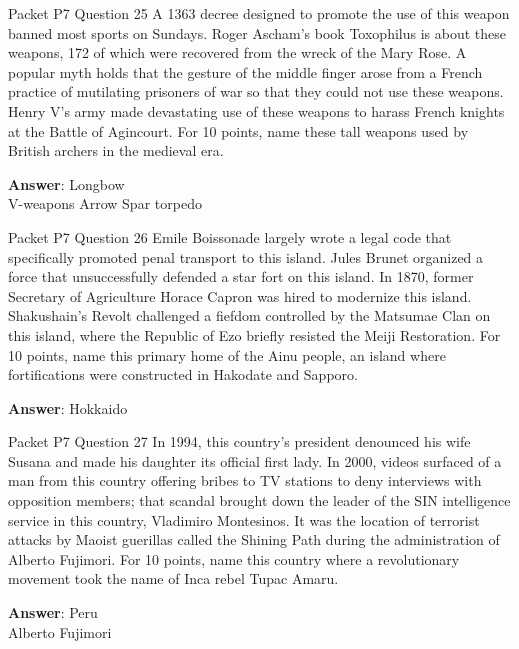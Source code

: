 \begin{frame}{Packet P7 Question 25}
A 1363 decree designed to promote the use of this weapon banned most sports on Sundays. Roger Ascham's book Toxophilus is about these weapons, 172 of which were recovered from the wreck of the Mary Rose. A popular myth holds that the gesture of the middle finger arose from a French practice of mutilating prisoners of war so that they could not use these weapons. Henry V's army made devastating use of these weapons to harass   French knights at the Battle of Agincourt. For 10 points, name these tall   weapons used by British archers in the medieval era.    

\textbf{Answer}: Longbow\\
 V-weapons
 Arrow
 Spar torpedo
\end{frame}

\begin{frame}{Packet P7 Question 26}
Emile Boissonade largely wrote a legal code that specifically promoted penal transport to this island. Jules Brunet organized a force that unsuccessfully defended a star fort on this island. In 1870, former Secretary of Agriculture Horace Capron was hired to modernize   this island. Shakushain’s Revolt challenged a fiefdom controlled by the Matsumae Clan on this island, where the Republic   of Ezo briefly   resisted the Meiji Restoration. For 10 points, name this primary home of the Ainu people, an island   where fortifications were constructed in Hakodate and Sapporo.

\textbf{Answer}: Hokkaido\\
\end{frame}

\begin{frame}{Packet P7 Question 27}
In 1994, this country’s president denounced his wife Susana and made his daughter its official first lady. In 2000, videos surfaced of a man from this country offering bribes to TV stations to deny interviews with opposition members; that scandal brought down the leader of the SIN intelligence service in this country, Vladimiro   Montesinos.     It was the location of terrorist attacks by Maoist guerillas   called the Shining Path during the administration   of Alberto Fujimori. For 10 points, name this country where a revolutionary movement took the name of Inca rebel Tupac Amaru.

\textbf{Answer}: Peru\\
 Alberto Fujimori
\end{frame}

